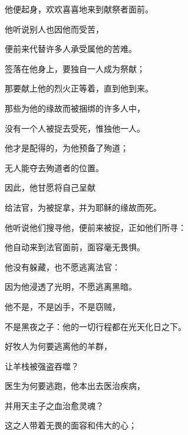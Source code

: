 他便起身，欢欢喜喜地来到献祭者面前。\par

他听说别人也因他而受苦，\par

便前来代替许多人承受属他的苦难。\par

签落在他身上，要独自一人成为祭献；\par

那要献上他的烈火正等着，直到他到来。\par

那些为他的缘故而被捆绑的许多人中，\par

没有一个人被捉去受死，惟独他一人。\par

他才是配得的，为他预备了殉道；\par

无人能夺去殉道者的位置。\par

因此，他甘愿将自己呈献\par

给法官，为被捉拿，并为耶稣的缘故而死。\par

他听说他们搜寻他，便前来被捉，正如他们所寻：\par

他自动来到法官面前，面容毫无畏惧。\par

他没有躲藏，也不愿逃离法官：\par

因为他浸透了光明，不愿逃离黑暗。\par

他不是，不是凶手，不是窃贼，\par

不是黑夜之子：他的一切行程都在光天化日之下。\par

好牧人为何要逃离他的羊群，\par

让羊栈被强盗吞噬？\par

医生为何要逃跑，他本出去医治疾病，\par

并用天主子之血治愈灵魂？\par

这之人带着无畏的面容和伟大的心；\par


